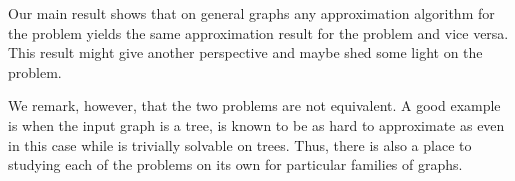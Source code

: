 Our main result shows that on general graphs any approximation algorithm for
the \Problem{} problem yields the same approximation result for the 
\ProblemGroup{} problem and vice versa.
This result might give another perspective and maybe shed some light on
the \ProblemGroup{} problem.

We remark, however, that the two problems are not equivalent.
A good example is when the input graph is a tree, \ProbGroup{} is known to 
be as hard to approximate as \ProbSetCover{} even in this case while \Prob{} is 
trivially solvable on trees.
Thus, there is also a place to studying each of the problems on its own for particular 
families of graphs.